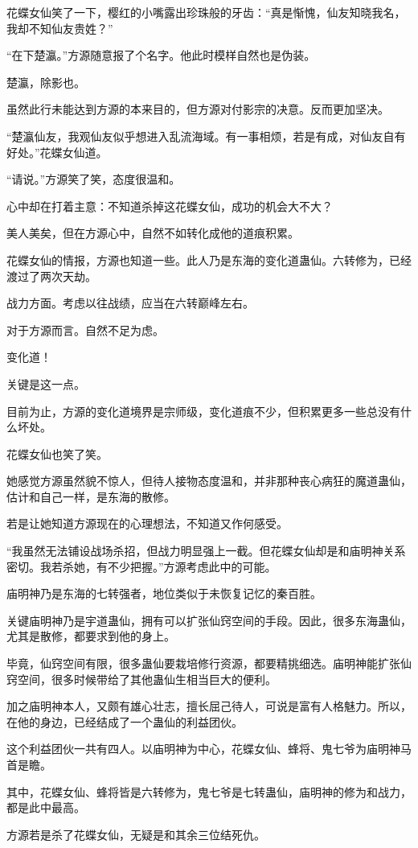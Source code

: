 \begin{this_body}
花蝶女仙笑了一下，樱红的小嘴露出珍珠般的牙齿：“真是惭愧，仙友知晓我名，我却不知仙友贵姓？”

“在下楚瀛。”方源随意报了个名字。他此时模样自然也是伪装。

楚瀛，除影也。

虽然此行未能达到方源的本来目的，但方源对付影宗的决意。反而更加坚决。

“楚瀛仙友，我观仙友似乎想进入乱流海域。有一事相烦，若是有成，对仙友自有好处。”花蝶女仙道。

“请说。”方源笑了笑，态度很温和。

心中却在打着主意：不知道杀掉这花蝶女仙，成功的机会大不大？

美人美矣，但在方源心中，自然不如转化成他的道痕积累。

花蝶女仙的情报，方源也知道一些。此人乃是东海的变化道蛊仙。六转修为，已经渡过了两次天劫。

战力方面。考虑以往战绩，应当在六转巅峰左右。

对于方源而言。自然不足为虑。

变化道！

关键是这一点。

目前为止，方源的变化道境界是宗师级，变化道痕不少，但积累更多一些总没有什么坏处。

花蝶女仙也笑了笑。

她感觉方源虽然貌不惊人，但待人接物态度温和，并非那种丧心病狂的魔道蛊仙，估计和自己一样，是东海的散修。

若是让她知道方源现在的心理想法，不知道又作何感受。

“我虽然无法铺设战场杀招，但战力明显强上一截。但花蝶女仙却是和庙明神关系密切。我若杀她，有不少把握。”方源考虑此中的可能。

庙明神乃是东海的七转强者，地位类似于未恢复记忆的秦百胜。

关键庙明神乃是宇道蛊仙，拥有可以扩张仙窍空间的手段。因此，很多东海蛊仙，尤其是散修，都要求到他的身上。

毕竟，仙窍空间有限，很多蛊仙要栽培修行资源，都要精挑细选。庙明神能扩张仙窍空间，很多时候带给了其他蛊仙生相当巨大的便利。

加之庙明神本人，又颇有雄心壮志，擅长屈己待人，可说是富有人格魅力。所以，在他的身边，已经结成了一个蛊仙的利益团伙。

这个利益团伙一共有四人。以庙明神为中心，花蝶女仙、蜂将、鬼七爷为庙明神马首是瞻。

其中，花蝶女仙、蜂将皆是六转修为，鬼七爷是七转蛊仙，庙明神的修为和战力，都是此中最高。

方源若是杀了花蝶女仙，无疑是和其余三位结死仇。


\end{this_body}
